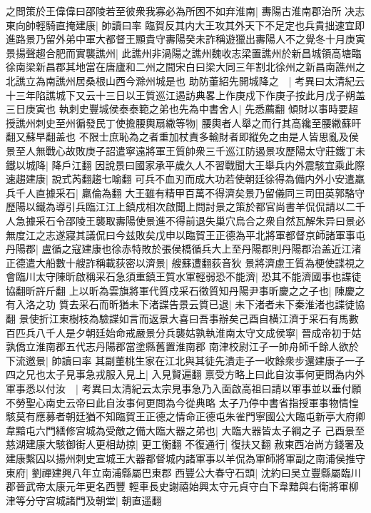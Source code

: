 之問策於王偉偉曰邵陵若至彼衆我寡必為所困不如弃淮南|{
	夀陽古淮南郡治所}
决志東向帥輕騎直掩建康|{
	帥讀曰率}
臨賀反其内大王攻其外天下不足定也兵貴拙速宜即進路景乃留外弟中軍大都督王顯貴守夀陽癸未詐稱遊獵出夀陽人不之覺冬十月庚寅景揚聲趨合肥而實襲譙州|{
	此譙州非渦陽之譙州魏收志梁置譙州於新昌城領高塘臨徐南梁新昌郡其地當在唐廬和二州之間宋白曰梁大同三年割北徐州之新昌南譙州之北譙立為南譙州居桑根山西今滁州城是也}
助防董紹先開城降之　|{
	考異曰太清紀云十三年陷譙城下又云十三日以王質巡江遏訪典畧上作庚戍下作庚子按此月戊子朔盖三日庚寅也}
執刺史豐城侯泰泰範之弟也先為中書舍人|{
	先悉薦翻}
傾財以事時要超授譙州刺史至州徧發民丁使擔腰輿扇繖等物|{
	腰輿者人舉之而行其高纔至腰繖蘇旰翻又蘇早翻盖也}
不限士庶恥為之者重加杖責多輸財者即縱免之由是人皆思亂及侯景至人無戰心故敗庚子詔遣寧遠將軍王質帥衆三千巡江防遏景攻歷陽太守莊鐵丁未鐵以城降|{
	降戶江翻}
因說景曰國家承平歲久人不習戰聞大王舉兵内外震駭宜乘此際速趨建康|{
	說式芮翻趨七喻翻}
可兵不血刃而成大功若使朝廷徐得為備内外小安遣羸兵千人直據采石|{
	羸倫為翻}
大王雖有精甲百萬不得濟矣景乃留儀同三司田英郭駱守歷陽以鐵為導引兵臨江江上鎮戍相次啟聞上問討景之策於都官尚書羊侃侃請以二千人急據采石令邵陵王襲取夀陽使景進不得前退失巢穴烏合之衆自然瓦解朱异曰景必無度江之志遂寢其議侃曰今兹敗矣戊申以臨賀王正德為平北將軍都督京師諸軍事屯丹陽郡|{
	盧循之寇建康也徐赤特敗於張侯橋循兵大上至丹陽郡則丹陽郡治盖近江渚}
正德遣大船數十艘詐稱載荻密以濟景|{
	艘蘇遭翻荻音狄}
景將濟慮王質為梗使諜視之會臨川太守陳昕啟稱采石急須重鎮王質水軍輕弱恐不能濟|{
	恐其不能濟國事也諜徒協翻昕許斤翻}
上以昕為雲旗將軍代質戍采石徵質知丹陽尹事昕慶之之子也|{
	陳慶之有入洛之功}
質去采石而昕猶未下渚諜告景云質已退|{
	未下渚者未下秦淮渚也諜徒協翻}
景使折江東樹枝為驗諜如言而返景大喜曰吾事辦矣己酉自横江濟于采石有馬數百匹兵八千人是夕朝廷始命戒嚴景分兵襲姑孰執淮南太守文成侯寧|{
	晉成帝初于姑孰僑立淮南郡五代志丹陽郡當塗縣舊置淮南郡}
南津校尉江子一帥舟師千餘人欲於下流邀景|{
	帥讀曰率}
其副董桃生家在江北與其徒先潰走子一收餘衆步還建康子一子四之兄也太子見事急戎服入見上|{
	入見賢遍翻}
禀受方略上曰此自汝事何更問為内外軍事悉以付汝　|{
	考異曰太清紀云太宗見事急乃入面啟高祖曰請以軍事並以垂付願不勞聖心南史云帝曰此自汝事何更問為今從典略}
太子乃停中書省指授軍事物情惶駭莫有應募者朝廷猶不知臨賀王正德之情命正德屯朱雀門寧國公大臨屯新亭大府卿韋黯屯六門繕修宫城為受敵之備大臨大器之弟也|{
	大臨大器皆太子綱之子}
己酉景至慈湖建康大駭御街人更相劫掠|{
	更工衡翻}
不復通行|{
	復扶又翻}
赦東西冶尚方錢署及建康繫囚以揚州刺史宣城王大器都督城内諸軍事以羊侃為軍師將軍副之南浦侯推守東府|{
	劉禪建興八年立南浦縣屬巴東郡}
西豐公大春守石頭|{
	沈約曰吴立豐縣屬臨川郡晉武帝太康元年更名西豐}
輕車長史謝禧始興太守元貞守白下韋黯與右衛將軍柳津等分守宫城諸門及朝堂|{
	朝直遥翻}
